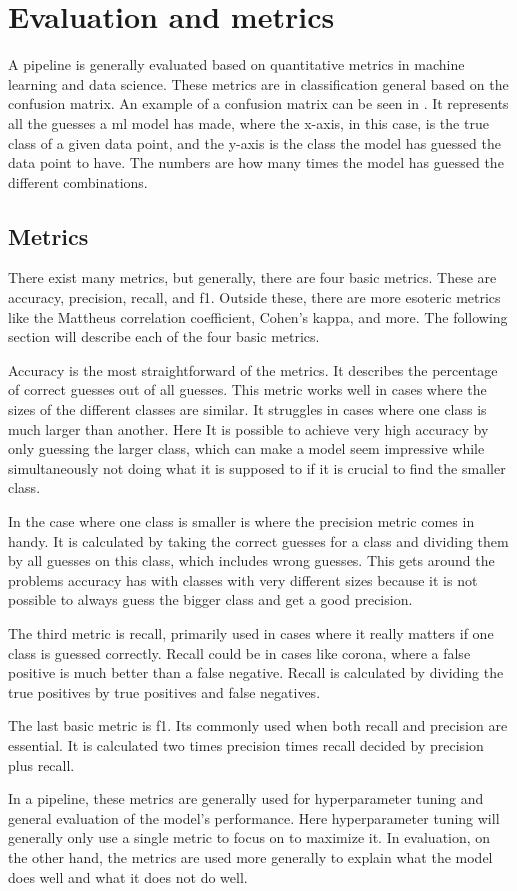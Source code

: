 \section{Evaluation and metrics}\label{sec:evalueation}

A pipeline is generally evaluated based on quantitative metrics in machine learning and data science. These metrics are in classification general based on the confusion matrix. An example of a confusion matrix can be seen in . It represents all the guesses a ml model has made, where the x-axis, in this case, is the true class of a given data point, and the y-axis is the class the model has guessed the data point to have. The numbers are how many times the model has guessed the different combinations. \cite{james-statistical-learning}

\subsection*{Metrics}

There exist many metrics, but generally, there are four basic metrics. These are accuracy, precision, recall, and f1. Outside these, there are more esoteric metrics like the Mattheus correlation coefficient, Cohen's kappa, and more. The following section will describe each of the four basic metrics. \cite{metrics-for-multi}

Accuracy is the most straightforward of the metrics. It describes the percentage of correct guesses out of all guesses. This metric works well in cases where the sizes of the different classes are similar. It struggles in cases where one class is much larger than another. Here It is possible to achieve very high accuracy by only guessing the larger class, which can make a model seem impressive while simultaneously not doing what it is supposed to if it is crucial to find the smaller class.

In the case where one class is smaller is where the precision metric comes in handy. It is calculated by taking the correct guesses for a class and dividing them by all guesses on this class, which includes wrong guesses. This gets around the problems accuracy has with classes with very different sizes because it is not possible to always guess the bigger class and get a good precision.

The third metric is recall, primarily used in cases where it really matters if one class is guessed correctly. Recall could be in cases like corona, where a false positive is much better than a false negative. Recall is calculated by dividing the true positives by true positives and false negatives.

The last basic metric is f1. Its commonly used when both recall and precision are essential. It is calculated two times precision times recall decided by precision plus recall.


In a pipeline, these metrics are generally used for hyperparameter tuning and general evaluation of the model's performance. Here hyperparameter tuning will generally only use a single metric to focus on to maximize it. In evaluation, on the other hand, the metrics are used more generally to explain what the model does well and what it does not do well. \cite{james-statistical-learning}